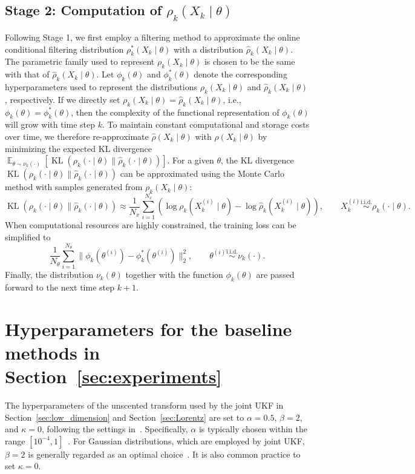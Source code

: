 \documentclass[preprint,3p,times]{elsarticle}
\DeclareMathOperator{\E}{\mathbb{E}}
\DeclareMathOperator{\KL}{KL}
\begin{document}
\subsection{Stage 2: Computation of $\rho_k(X_k \mid \theta)$}
Following Stage 1, we first employ a filtering method to approximate the online conditional filtering distribution $\rho_k^*(X_k \mid \theta)$ with a distribution $\hat{\rho}_k(X_k \mid \theta)$. The parametric family used to represent $\rho_k(X_k \mid \theta)$ is chosen to be the same with that of $\hat{\rho}_k(X_k \mid \theta)$. Let $\phi_k(\theta)$ and $\phi_k^*(\theta)$ denote the corresponding hyperparameters used to represent the distributions $\rho_k(X_k \mid \theta)$ and $\hat{\rho}_k(X_k \mid \theta)$, respectively. If we directly set $\rho_k(X_k \mid \theta) = \hat{\rho}_k(X_k \mid \theta)$, i.e., $\phi_k(\theta) = \phi_k^*(\theta)$, then the complexity of the functional representation of $\phi_k(\theta)$ will grow with time step $k$. To maintain constant computational and storage costs over time, we therefore re-approximate $\hat{\rho}(X_k \mid \theta)$ with $\rho(X_k \mid \theta)$ by minimizing the expected KL divergence $\E_{\theta \sim \nu_k(\cdot)}[\KL\left(\rho_k(\cdot \mid \theta) \lVert \hat{\rho}_k(\cdot \mid \theta)\right)]$. For a given $\theta$, the KL divergence $\KL\left(\rho_k(\cdot \mid \theta) \lVert \hat{\rho}_k(\cdot \mid \theta)\right)$ can be approximated using the Monte Carlo method with samples generated from $\rho_k(X_k \mid \theta)$:
\begin{equation*}
\KL\left(\rho_k(\cdot \mid \theta) \lVert \hat{\rho}_k(\cdot \mid \theta)\right) \approx \frac{1}{N_x}\sum_{i=1}^{N_x} \left(\log \rho_k(X_k^{(i)} \mid \theta) - \log \hat{\rho}_k(X_k^{(i)} \mid \theta) \right), \qquad X_k^{(i)} \overset{\mathrm{i.i.d.}}{\sim} \rho_k(\cdot \mid \theta).
\end{equation*}  
When computational resources are highly constrained, the training loss can be simplified to  
\begin{equation*}
\frac{1}{N_{\theta}}\sum_{i=1}^{N_{\theta}} \big\lVert \phi_k(\theta^{(i)}) - \phi_k^*(\theta^{(i)}) \big\rVert_2^2, 
\qquad \theta^{(i)} \overset{\mathrm{i.i.d.}}{\sim} \nu_k(\cdot).
\end{equation*}
Finally, the distribution $\nu_k(\theta)$ together with the function $\phi_k(\theta)$ are passed forward to the next time step $k+1$.

\section{Hyperparameters for the baseline methods in Section~\ref{sec:experiments}}
\label{app:hyper_param}
The hyperparameters of the unscented transform used by the joint UKF in Section~\ref{sec:low_dimension} and Section~\ref{sec:Lorentz} are set to $\alpha = 0.5$, $\beta = 2$, and $\kappa = 0$, following the settings in~\cite{joint_ukf2}. Specifically, $\alpha$ is typically chosen within the range $[10^{-4}, 1]$~\cite{joint_ukf2}. For Gaussian distributions, which are employed by joint UKF, $\beta = 2$ is generally regarded as an optimal choice~\cite{julier2002scaled}. It is also common practice to set $\kappa = 0$.
\end{document}
